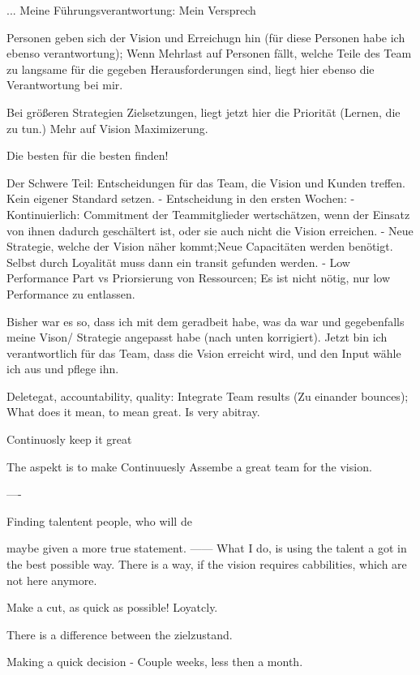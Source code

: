 ... Meine Führungsverantwortung:
Mein Versprech

Personen geben sich der Vision und Erreichugn hin (für diese Personen habe ich ebenso verantwortung); Wenn Mehrlast auf Personen fällt, welche Teile des Team zu langsame für die gegeben Herausforderungen sind, liegt hier ebenso die Verantwortung bei mir.


Bei größeren Strategien Zielsetzungen, liegt jetzt hier die Priorität (Lernen, die zu tun.)
Mehr auf Vision Maximizerung.

Die besten für die besten finden!


Der Schwere Teil: Entscheidungen für das Team, die Vision und Kunden treffen. Kein eigener Standard setzen.
- Entscheidung in den ersten Wochen: 
- Kontinuierlich: Commitment der Teammitglieder wertschätzen, wenn der Einsatz von ihnen dadurch geschältert ist, oder sie auch nicht die Vision erreichen.
- Neue Strategie, welche der Vision näher kommt;Neue Capacitäten werden benötigt. Selbst durch Loyalität muss dann ein transit gefunden werden.
- Low Performance Part vs Priorsierung von Ressourcen; Es ist nicht nötig, nur low Performance zu entlassen.

Bisher war es so, dass ich mit dem geradbeit habe, was da war und gegebenfalls meine Vison/ Strategie angepasst habe (nach unten korrigiert).
Jetzt bin ich verantwortlich für das Team, dass die Vsion erreicht wird, und den Input wähle ich aus und pflege ihn.

Deletegat, accountability, quality: Integrate Team results (Zu einander bounces); 
What does it mean, to mean great. Is very abitray.


Continuosly keep it great

The aspekt is to make Continuuesly Assembe a great team for the vision.

—-






Finding talentent people, who will de

maybe given a more true statement.
——
What I do, is using the talent a got in the best possible way. 
There is a way, if the vision requires cabbilities, which are not here anymore.

Make a cut, as quick as possible!
Loyatcly. 

There is a difference between the zielzustand.

Making a quick decision - Couple weeks, less then a month.


